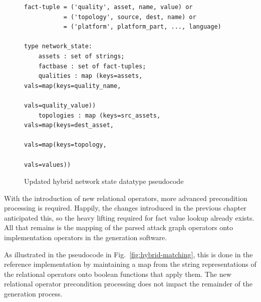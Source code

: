 \begin{figure}
\begin{lstlisting}
fact-tuple = ('quality', asset, name, value) or
           = ('topology', source, dest, name) or
           = ('platform', platform_part, ..., language)

type network_state:
    assets : set of strings;
    factbase : set of fact-tuples;
    qualities : map (keys=assets, vals=map(keys=quality_name,
                                           vals=quality_value))
    topologies : map (keys=src_assets, vals=map(keys=dest_asset,
                                                vals=map(keys=topology,
                                                         vals=values))
\end{lstlisting}
\caption{Updated hybrid network state datatype pseudocode}
\label{fig:netstate_map_hybrid_pc}
\end{figure}
With the introduction of new relational operators, more advanced
precondition processing is required. Happily, the changes introduced
in the previous chapter anticipated this, so the heavy lifting required for
fact value lookup already exists. All that remains is the mapping of the
parsed attack graph operators onto implementation operators in the generation
software.

As illustrated in the pseudocode in Fig.~\ref{fig:hybrid-matching}, this is
done in the reference implementation by maintaining a map from the string
representations of the relational operators onto boolean functions that apply
them. The new relational operator precondition processing does not impact the
remainder of the generation process.

